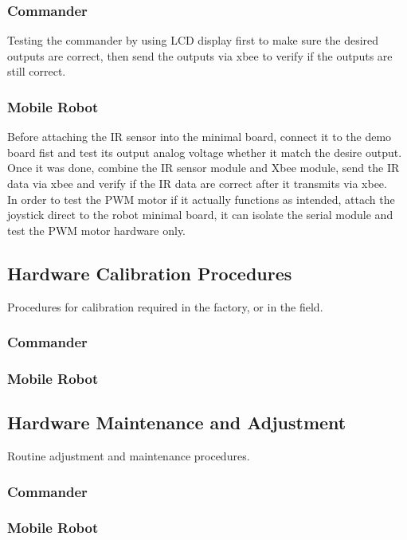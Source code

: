 \documentclass[11pt,a4paper]{article}
\begin{document}
    \subsubsection{Commander}
    Testing the commander by using LCD display first to make sure the desired outputs are correct, then send the outputs via
    xbee to verify if the outputs are still correct. \\
    
    \subsubsection{Mobile Robot}
    Before attaching the IR sensor into the minimal board, connect it to the demo board fist and test its output analog          voltage whether it match the desire output. Once it was done, combine the IR sensor module and Xbee module, send the IR      data via xbee and verify if the IR data are correct after it transmits via xbee.\\
    In order to test the PWM motor if it actually functions as intended, attach the joystick direct to the robot minimal         board, it can isolate the serial module and test the PWM motor hardware only. \\

  \subsection{Hardware Calibration Procedures}
    Procedures for calibration required in the factory, or in the field.
    \subsubsection{Commander}
    \subsubsection{Mobile Robot}

  \subsection{Hardware Maintenance and Adjustment}
    Routine adjustment and maintenance procedures.
    \subsubsection{Commander}
    \subsubsection{Mobile Robot}
\end{document}
